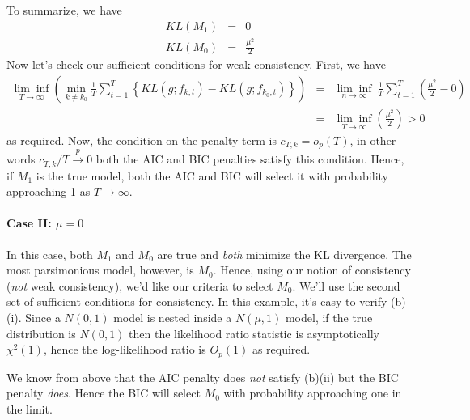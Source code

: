 \documentclass[12pt]{article}
\theoremstyle{definition}
\begin{document}
To summarize, we have
	\begin{eqnarray*}
		KL(M_1) &=&0\\
		KL(M_0) &=& \frac{\mu^2}{2}
	\end{eqnarray*}
Now let's check our sufficient conditions for weak consistency. First, we have
	\begin{eqnarray*}
		\underset{T\rightarrow \infty}{\lim\inf}\left(\underset{k \neq k_0}{\min} \frac{1}{T}\sum_{t = 1}^T \left\{ KL(g; f_{k,t}) - KL(g;f_{k_0,t}) \right\} \right) &=& \underset{n\rightarrow \infty}{\lim\inf}\ \frac{1}{T}\sum_{t = 1}^T  \left(\frac{\mu^2}{2} - 0\right) \\
		&=&  \underset{T\rightarrow \infty}{\lim\inf}\left(\frac{\mu^2}{2}\right) >0
	\end{eqnarray*}
as required. Now, the condition on the penalty term is $c_{T,k} = o_p(T)$, in other words $c_{T,k}/T \overset{p}{\rightarrow} 0$ both the AIC and BIC penalties satisfy this condition. Hence, if $M_1$ is the true model, both the AIC and BIC will select it with probability approaching 1 as $T\rightarrow \infty$.

\paragraph{Case II: $\mu = 0$} In this case, both $M_1$ and $M_0$ are true and \emph{both} minimize the KL divergence. The most parsimonious model, however, is $M_0$. Hence, using our notion of consistency (\emph{not} weak consistency), we'd like our criteria to select $M_0$. We'll use the second set of sufficient conditions for consistency. In this example, it's easy to verify (b)(i). Since a $N(0,1)$ model is nested inside a $N(\mu,1)$ model, if the true distribution is $N(0,1)$ then the likelihood ratio statistic is asymptotically $\chi^2(1)$, hence the log-likelihood ratio is $O_p(1)$ as required. 

We know from above that the AIC penalty does \emph{not} satisfy (b)(ii) but the BIC penalty \emph{does}. Hence the BIC will select $M_0$ with probability approaching one in the limit.
\end{document}
